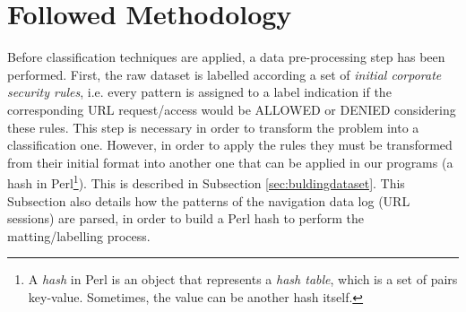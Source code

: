 \documentclass{llncs}
\begin{document}

\section{Followed Methodology}
\label{sec:methodology}

\noindent Before classification techniques are applied, a data pre-processing step has been performed. First, the raw dataset is labelled according a set of \textit{initial corporate security rules}, i.e. every pattern is assigned to a label indication if the corresponding URL request/access would be ALLOWED or DENIED considering these rules. This step is necessary in order to transform the problem into a classification one. However, in order to apply the rules they must be transformed from their initial format into another one that can be applied in our programs (a hash in Perl\footnote{A \textit{hash} in Perl is an object that represents a \textit{hash table}, which is a set of pairs key-value. Sometimes, the value can be another hash itself.}). This is described in Subsection \ref{sec:buldingdataset}. This Subsection also details how the patterns of the navigation data log (URL sessions) are parsed, in order to build a Perl hash to perform the matting/labelling process.
\end{document}

